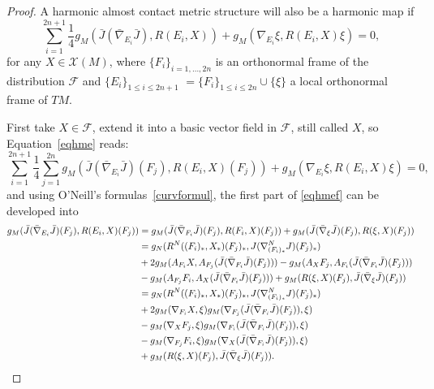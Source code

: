 \documentclass[a4paper,reqno]{amsart}
\theoremstyle{definition}
\theoremstyle{remark}
\theoremstyle{plain}
\numberwithin{equation}{section}
\newcommand{\calX}{{\mathcal{X}}}
\newcommand{\f}{\mathcal{F}}
\begin{document}
\begin{proof}
A harmonic almost contact metric structure will also be a
harmonic map if 
\begin{equation}\label{eqhme}
\sum_{i=1}^{2n+1} \frac14 g_M(\bar{J} (\bar{\nabla}_{E_i}
\bar{J}) , R(E_{i}, X))  +  g_M(\nabla_{E_i}\xi , R(E_{i},X)\xi) =0,
\end{equation}
for any $X\in \calX(M)$, where $\{F_i\}_{i=1,\dots,2n}$ is an
orthonormal frame of the distribution $\f$ and  
$\{E_i\}_{1 \le i \le 2n+1}$ $=\{F_i\}_{1\le i\le 2n}\cup \{\xi\}$ a local orthonormal frame of $TM$.


First take $X\in \f$, extend it into a basic vector field in
$\f$, still called $X$, so Equation~\eqref{eqhme} reads: 
\begin{equation}\label{eqhmef}
\sum_{i=1}^{2n+1} \frac14 \sum_{j=1}^{2n} g_M(\bar{J} (\bar{\nabla}_{E_i} \bar{J})(F_j) , R(E_{i}, X)(F_j)) + g_M(\nabla_{E_i}\xi , R(E_{i},X)\xi) =0,
\end{equation}
and using O'Neill's formulas~\eqref{curvformul}, the first part
of \eqref{eqhmef} can be developed into 
\begin{align}
     g_M(\bar{J} (\bar{\nabla}_{E_i} \bar{J})(F_j) , R(E_{i}, X)(F_j)) &= g_M(\bar{J} (\bar{\nabla}_{F_i} \bar{J})(F_j) , R(F_{i}, X)(F_j)) +
    g_M(\bar{J} (\bar{\nabla}_{\xi} \bar{J})(F_j) , R(\xi, X)(F_j)) \notag \\
&= g_N(  R^N((F_i)_*, X_* )(F_j)_* ,
   J(\nabla^N_{(F_i)_*}  J)(F_{j})_*) \notag \\ & +2
  g_M(A_{F_i}X, A_{F_j} (\bar{J}(\bar{\nabla}_{F_i} \bar{J})(F_{j}))) \notag
   - g_M(A_{X}  F_j,A_{F_i}(\bar{J}(\bar{\nabla}_{F_i} \bar{J})(F_{j}))) \notag\\
  &-   g_M(A_{F_j}F_i,A_{X} (\bar{J}(\bar{\nabla}_{F_i} \bar{J})(F_{j}))) + g_M(R(\xi, X)(F_{j}) , \bar{J}(\bar{\nabla}_{\xi} \bar{J})(F_{j})) \notag\\
&= g_N(  R^N((F_i)_*, X_* )(F_j)_* ,  J(\nabla^N_{(F_i)_*}  J)(F_{j})_*) \label{e1}\\
&+2 g_M(\nabla_{F_i}X,\xi) g_M(\nabla_{F_j} (\bar{J}(\bar{\nabla}_{F_i} \bar{J})(F_{j})), \xi) \label{e2}\\
&- g_M(\nabla_{X}  F_j,\xi) g_M(\nabla_{F_i}(\bar{J}(\bar{\nabla}_{F_i} \bar{J})(F_{j})), \xi)\label{e3}\\
&- g_M(\nabla_{F_j}F_i,\xi) g_M(\nabla_{X} (\bar{J}(\bar{\nabla}_{F_i} \bar{J})(F_{j})), \xi) \label{e4}\\
&+g_M(R(\xi, X)(F_{j}) , \bar{J}(\bar{\nabla}_{\xi} \bar{J})(F_{j})) \label{e5}.

\end{align}
\end{proof}
\end{document}

